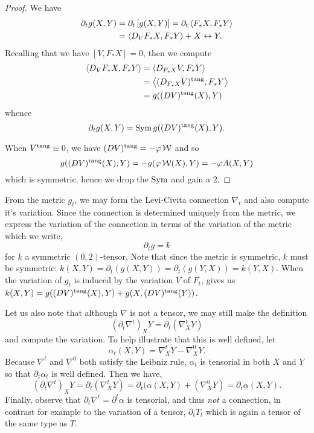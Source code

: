 \begin{proof}
We have
\[
\begin{split}
\partial_t g (X, Y) &= \partial_t \left[g(X, Y)\right] = \partial_t \left\langle F_{\ast} X,F_{\ast} Y \right\rangle \\
&= \left\langle D_V F_{\ast} X,F_{\ast} Y \right\rangle + X \leftrightarrow Y.
\end{split}
\]
Recalling that we have \([V, F_{\ast} X] = 0\), then we compute
\[
\begin{split}
\left\langle D_V F_{\ast} X,F_{\ast} Y \right\rangle &= \left\langle D_{F_{\ast} X} V,F_{\ast} Y \right\rangle \\
&= \left\langle (D_{F_{\ast} X} V)^{\operatorname{tang}},F_{\ast} Y \right\rangle \\
&= g((DV)^{\operatorname{tang}} (X), Y)
\end{split}
\]
whence
\[
\partial_t g (X, Y) = \operatorname{Sym} g((DV)^{\operatorname{tang}} (X), Y).
\]

When \(V^{\operatorname{tang}} \equiv 0\), we have \((DV)^{\operatorname{tang}} = -\varphi \operatorname{\mathcal{W}}\) and so
\[
g((DV)^{\operatorname{tang}}(X), Y) = -g(\varphi \operatorname{\mathcal{W}}(X), Y) = -\varphi A(X, Y)
\]
which is symmetric, hence we drop the \(\operatorname{Sym}\) and gain a \(2\).
\end{proof}

From the metric \(g_t\), we may form the Levi-Civita connection \(\nabla_t\) and also compute it's variation. Since the connection is determined uniquely from the metric, we express the variation of the connection in terms of the variation of the metric which we write,
\[
\partial_t g = k
\]
for \(k\) a symmetric \((0, 2)\)-tensor. Note that since the metric is symmetric, \(k\) must be symmetric: \(k(X, Y) = \partial_t (g(X, Y)) = \partial_t (g(Y, X)) = k(Y, X)\). When the variation of \(g_t\) is induced by the variation \(V\) of \(F_t\),  gives us \(k(X, Y) = g((DV)^{\operatorname{tang}} (X), Y) + g(X, (DV)^{\operatorname{tang}} (Y))\).

\begin{rem}
Let us also note that although \(\nabla\) is not a tensor, we may still make the definition
\[
(\partial_t \nabla^t)_X Y = \partial_t(\nabla^t_X Y)
\]
and compute the variation. To help illustrate that this is well defined, let
\[
\alpha_t(X, Y) = \nabla^t_X Y - \nabla^0_X Y.
\]
Because \(\nabla^t\) and \(\nabla^0\) both satisfy the Leibniz rule, \(\alpha_t\) is tensorial in both \(X\) and \(Y\) so that \(\partial_t \alpha_t\) is well defined. Then we have,
\[
(\partial_t \nabla^t)_X Y = \partial_t(\nabla^t_X Y) = \partial_t (\alpha(X, Y) + (\nabla^0_X Y) = \partial_t \alpha (X, Y).
\]
Finally, observe that \(\partial_t \nabla^t = \partial^t \alpha\) is tensorial, and thus \emph{not} a connection, in contrast for example to the variation of a tensor, \(\partial_t T_t\) which is again a tensor of the same type as \(T\).
\end{rem}

